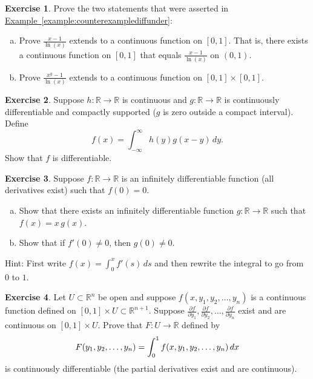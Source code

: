 \documentclass[12pt,openany]{book}
\newcommand{\avoidbreak}{\postdisplaypenalty=100}
\newcommand{\R}{{\mathbb{R}}}
\theoremstyle{plain}
\theoremstyle{remark}
\theoremstyle{definition}
\newenvironment{exbox}{%
    \def\FrameCommand{\vrule width 1pt \relax\hspace{10pt}}%
    \MakeFramed{\advance\hsize-\width\FrameRestore}%
}{%
    \endMakeFramed
}
\newenvironment{exparts}{%
    \leavevmode\begin{enumerate}[a),noitemsep,topsep=0pt,parsep=0pt,partopsep=0pt]
}{%
    \end{enumerate}
}
\theoremstyle{exercise}
\newtheorem{exercise}{Exercise}[section]
\theoremstyle{example}
\newcommand{\exampleref}[1]{\hyperref[#1]{Example~\ref*{#1}}}
\begin{document}
\begin{exbox}
\begin{exercise} \label{exercise:counterexamplediffunder}
Prove the two statements that were asserted in
\exampleref{example:counterexamplediffunder}:
\begin{exparts}
\item
Prove $\frac{x-1}{\ln(x)}$ extends to a continuous function on
$[0,1]$.  That is, there exists a continuous function on $[0,1]$
that equals $\frac{x-1}{\ln(x)}$ on $(0,1)$.
\item
Prove $\frac{x^y-1}{\ln(x)}$ extends to a continuous function
on $[0,1] \times [0,1]$.
\end{exparts}
\end{exercise}

\begin{exercise}
Suppose $h \colon \R \to \R$ is continuous and $g
\colon \R \to \R$ is continuously differentiable and compactly
supported ($g$ is zero outside a compact interval).  Define
\begin{equation*}
f(x) = \int_{-\infty}^\infty h(y)g(x-y) \, dy  .
\end{equation*}
Show that $f$ is differentiable.
\end{exercise}

\begin{exercise}
Suppose $f \colon \R \to \R$ is an infinitely differentiable function (all derivatives exist)
such that $f(0) = 0$.
\begin{exparts}
\item
Show that there exists an infinitely
differentiable function $g \colon \R \to \R$ such that $f(x) = x\,g(x)$.
\item
Show that
if $f'(0) \neq 0$, then $g(0) \neq 0$.
\end{exparts}
Hint: First write
$f(x) = \int_0^x f'(s) \,ds$ and then rewrite the integral to go
from $0$ to $1$.
\end{exercise}

\begin{exercise}%
\label{exercise:severalvariableLeibniz}
Let $U \subset \R^n$ be open and suppose
$f(x,y_1,y_2,\ldots,y_n)$ is a continuous
function defined on $[0,1] \times U \subset \R^{n+1}$.
Suppose
$\frac{\partial f}{\partial y_1},
\frac{\partial f}{\partial y_2},\ldots,
\frac{\partial f}{\partial y_n}$
exist and are continuous on $[0,1] \times U$.
Prove that $F \colon U \to \R$ defined by
\begin{equation*}
F(y_1,y_2,\ldots,y_n) =
\int_0^1
f(x,y_1,y_2,\ldots,y_n)
\, dx
\avoidbreak
\end{equation*}
is continuously differentiable (the partial derivatives exist and are
continuous).
\end{exercise}


\end{exbox}
\end{document}
